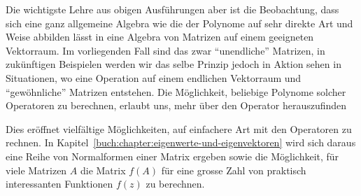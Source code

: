 Die wichtigste Lehre aus obigen Ausführungen aber ist
die Beobachtung, dass sich eine ganz allgemeine Algebra
wie die der Polynome auf sehr direkte Art und Weise 
abbilden lässt in eine Algebra von Matrizen auf einem
geeigneten Vektorraum.
Im vorliegenden Fall sind das zwar ``unendliche''
Matrizen, in zukünftigen Beispielen werden wir das
selbe Prinzip jedoch in Aktion sehen in Situationen,
wo eine Operation auf einem endlichen Vektorraum
und ``gewöhnliche'' Matrizen entstehen.
Die Möglichkeit, beliebige Polynome solcher Operatoren
zu berechnen, erlaubt uns, mehr über den Operator 
herauszufinden

Dies eröffnet vielfältige Möglichkeiten, auf einfachere
Art mit den Operatoren zu rechnen.
In Kapitel~\ref{buch:chapter:eigenwerte-und-eigenvektoren}
wird sich daraus eine Reihe von Normalformen einer Matrix
ergeben sowie die Möglichkeit, für viele Matrizen $A$
die Matrix $f(A)$ für eine grosse Zahl von praktisch
interessanten Funktionen $f(z)$ zu berechnen.

